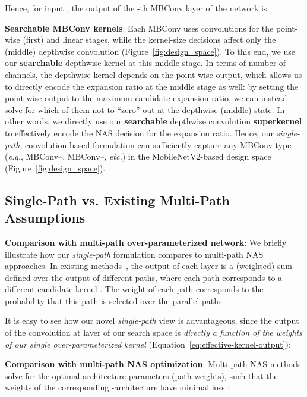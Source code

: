 \documentclass[runningheads]{llncs}
\begin{document}
Hence, for  input , the output of the -th MBConv layer of the network is: 


\textbf{Searchable MBConv kernels}: Each MBConv uses  convolutions for 
the point-wise (first) and linear stages, while the kernel-size decisions 
affect only the (middle)  depthwise convolution (Figure~\ref{fig:design_space}). 
To this end, we use our \textbf{searchable}  depthwise 
kernel at this middle stage. In terms of number of channels, the depthwise 
kernel depends on the point-wise  output, which allows us to 
directly encode the expansion ratio  at the middle stage as well: 
by setting the point-wise  output to 
the maximum candidate expansion ratio, we can instead solve for which 
of them not to ``zero'' out at the depthwise (middle) state.
In other words, we directly use our \textbf{searchable} depthwise convolution 
\textbf{superkernel} to effectively encode the NAS decision for the expansion ratio.
Hence, our \textit{single-path}, convolution-based formulation can sufficiently capture 
any MBConv type (\textit{e.g.}, MBConv--, MBConv--,
\textit{etc.}) in the MobileNetV2-based design space (Figure~\ref{fig:design_space}).


\subsection{Single-Path vs. Existing Multi-Path Assumptions}
\label{subsec:comparison-vs-multi}

\textbf{Comparison with multi-path over-parameterized network}:
We briefly illustrate how our \textit{single-path} formulation compares to multi-path 
NAS approaches. In existing methods~\cite{cai2018proxylessnas,liu2018darts,wu2018fbnet},
the output of each layer  is a (weighted) sum defined over the output of  
different paths, where each path  corresponds to a different candidate 
kernel . The weight of each path 
 corresponds to the probability that this path 
is selected over the parallel paths:

It is easy to see how our novel \textit{single-path} view is advantageous, 
since the output of the convolution at layer  of our search space 
is \textit{directly a function of the weights of our single over-parameterized kernel} 
(Equation~\ref{eq:effective-kernel-output}): 



\textbf{Comparison with multi-path NAS optimization}: 
Multi-path NAS methods solve for the optimal architecture parameters 
 (path weights), such that the weights 
 of the corresponding -architecture have minimal 
loss :
\end{document}
